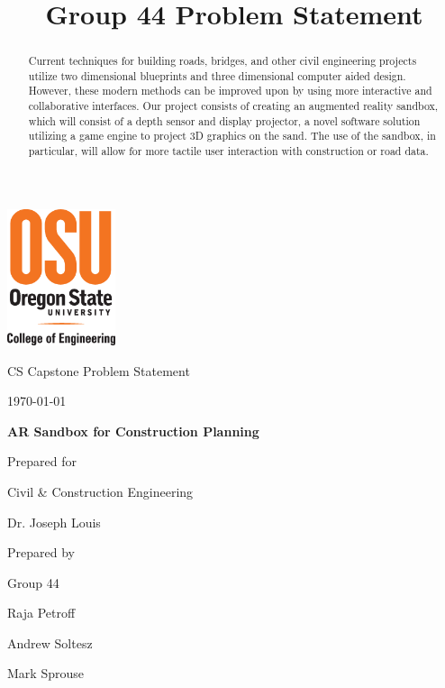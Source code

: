 \documentclass[onecolumn, draftclsnofoot,10pt, compsoc]{IEEEtran}
\title{Group 44 Problem Statement}
\def \CapstoneTeamName{		The Cleverly Named Team}
\def \CapstoneTeamNumber{		44}
\def \GroupMemberOne{			Raja Petroff}
\def \GroupMemberTwo{			Andrew Soltesz}
\def \GroupMemberThree{			Mark Sprouse}
\def \CapstoneProjectName{		AR Sandbox for Construction Planning}
\def \CapstoneSponsorCompany{	Civil \& Construction Engineering}
\def \CapstoneSponsorPerson{		Dr. Joseph Louis}
\def \DocType{		Problem Statement
				}
\newcommand{\NameSigPair}[1]{\par
\makebox[2.75in][r]{#1} \hfil 	\makebox[3.25in]{\makebox[2.25in]{\hrulefill} \hfill		\makebox[.75in]{\hrulefill}}
\par\vspace{-12pt} \textit{\tiny\noindent
\makebox[2.75in]{} \hfil		\makebox[3.25in]{\makebox[2.25in][r]{Signature} \hfill	\makebox[.75in][r]{Date}}}}
\renewcommand{\NameSigPair}[1]{#1}
\begin{document}
\begin{titlepage}
    \begin{singlespace}
    	\includegraphics[height=4cm]{coe_v_spot1}
        \hfill 
        \par\vspace{.2in}
        \centering
        \scshape{
            \huge CS Capstone \DocType \par
            {\large\today}\par
            \vspace{.5in}
            \textbf{\Huge\CapstoneProjectName}\par
            \vfill
            {\large Prepared for}\par
            \Huge \CapstoneSponsorCompany\par
            \vspace{5pt}
            {\Large\NameSigPair{\CapstoneSponsorPerson}\par}
            {\large Prepared by }\par
            Group\CapstoneTeamNumber\par
            \vspace{5pt}
            {\Large
                \NameSigPair{\GroupMemberOne}\par
                \NameSigPair{\GroupMemberTwo}\par
                \NameSigPair{\GroupMemberThree}\par
            }
            \vspace{20pt}
        }
        \begin{abstract}
        	Current techniques for building roads, bridges, and other civil engineering projects utilize two dimensional blueprints and three dimensional computer aided design.
			However, these modern methods can be improved upon by using more interactive and collaborative interfaces.
			Our project consists of creating an augmented reality sandbox, which will consist of a depth sensor and display projector, a novel software solution utilizing a game engine to project 3D graphics on the sand.
			The use of the sandbox, in particular, will allow for more tactile user interaction with construction or road data.
        \end{abstract}     
    \end{singlespace}
\end{titlepage}
\end{document}
